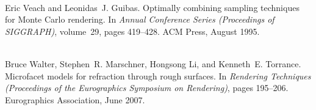 \begin{DoxyDescription}
\item[\label{citelist_CITEREF_Veach:1995:Optimally}%
\Hypertarget{citelist_CITEREF_Veach:1995:Optimally}%
\mbox{[}13\mbox{]}]\hfill \\
Eric Veach and Leonidas~J. Guibas. Optimally combining sampling techniques for Monte Carlo rendering. In {\itshape Annual Conference Series (Proceedings of SIGGRAPH)}, volume~29, pages 419--428. ACM Press, August 1995. 


\item[\label{citelist_CITEREF_Walter:2007:Microfacet}%
\Hypertarget{citelist_CITEREF_Walter:2007:Microfacet}%
\mbox{[}14\mbox{]}]\hfill \\
Bruce Walter, Stephen~R. Marschner, Hongsong Li, and Kenneth~E. Torrance. Microfacet models for refraction through rough surfaces. In {\itshape Rendering Techniques (Proceedings of the Eurographics Symposium on Rendering)}, pages 195--206. Eurographics Association, June 2007. 


\end{DoxyDescription}